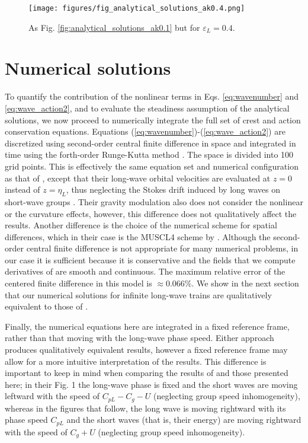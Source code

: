 \documentclass[lineno]{jfm}
\begin{document}
\begin{figure}
\centering
\texttt{[image: figures/fig\_analytical\_solutions\_ak0.4.png]}
\caption{As Fig. \ref{fig:analytical_solutions_ak0.1} but for $\varepsilon_L = 0.4$.}
\label{fig:analytical_solutions_ak0.4}
\end{figure}

\section{Numerical solutions}
\label{section:numerical_solutions}

To quantify the contribution of the nonlinear terms in Eqs. \ref{eq:wavenumber}
and \ref{eq:wave_action2}, and to evaluate the steadiness assumption of the
analytical solutions, we now proceed to numerically integrate the full set of
crest and action conservation equations.
Equations (\ref{eq:wavenumber})-(\ref{eq:wave_action2}) are discretized using
second-order central finite difference in space and integrated in time using the
forth-order Runge-Kutta method \citep{butcher1996runge}.
The space is divided into 100 grid points.
This is effectively the same equation set and numerical configuration as that of
\citet{peureux2021unsteady}, except that their long-wave orbital velocities are
evaluated at $z=0$ instead of $z=\eta_L$, thus neglecting the Stokes drift
induced by long waves on short-wave groups
\citep{stokes1846,van2018stokes,monismith2020stokes}.
Their gravity modulation also does not consider the nonlinear or the curvature
effects, however, this difference does not qualitatively affect the results.
Another difference is the choice of the numerical scheme for spatial differences,
which in their case is the MUSCL4 scheme by \citet{kurganov2000new}.
Although the second-order central finite difference is not appropriate for many
numerical problems, in our case it is sufficient because it is conservative and
the fields that we compute derivatives of are smooth and continuous.
The maximum relative error of the centered finite difference in this model
is $\approx 0.066\%$.
We show in the next section that our numerical solutions for infinite long-wave
trains are qualitatively equivalent to those of \citet{peureux2021unsteady}.

Finally, the numerical equations here are integrated in a fixed reference frame,
rather than that moving with the long-wave phase speed.
Either approach produces qualitatively equivalent results, however a fixed
reference frame may allow for a more intuitive interpretation of the results.
This difference is important to keep in mind when comparing the results
of \citet{peureux2021unsteady} and those presented here; in their Fig. 1 the
long-wave phase is fixed and the short waves are moving leftward
with the speed of $C_{pL} - C_g - U$ (neglecting group speed inhomogeneity),
whereas in the figures that follow, the long wave is moving rightward with its
phase speed $C_{pL}$ and the short waves (that is, their energy) are moving
rightward with the speed of $C_g + U$ (neglecting group speed inhomogeneity).
\end{document}
